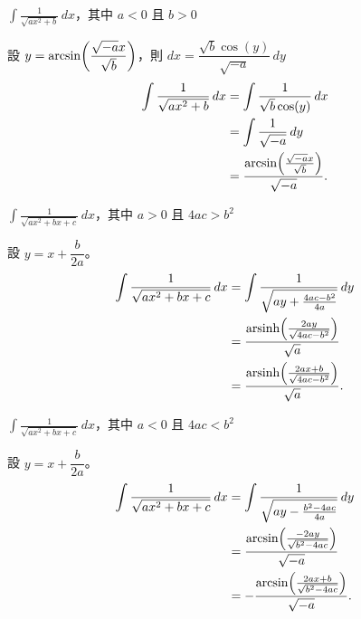 \documentclass{beamer}
\newcommand{\Left} {\mathopen{}\mathclose\bgroup\left}
\newcommand{\Right}{\aftergroup\egroup\right}
\newcommand{\arsinh}{\operatorname{arsinh}}
\theoremstyle{remark}
\begin{document}
\begin{CJK}{UTF8}{bsmi}
\begin{frame}{$\displaystyle \int \frac{1}{\sqrt{ax^2 + b}}\,dx$，其中 $a < 0$ 且 $b > 0$}
  \begin{solution}
    設 $y = \arcsin \Left( \dfrac{\sqrt{-a}x}{\sqrt b} \Right)$，則 $dx = \dfrac{\sqrt b \cos(y)}{\sqrt{-a}}\,dy$
    \begin{align*}
      \int \frac{1}{\sqrt{ax^2 + b}}\,dx &= \int \frac{1}{\sqrt b \cos(y)}\,dx\\
	&= \int \frac{1}{\sqrt{-a}}\,dy\\
	&= \frac{\arcsin \Left( \frac{\sqrt{-a}x}{\sqrt b} \Right)}{\sqrt{-a}}.
    \end{align*}
  \end{solution}
\end{frame}

\begin{frame}{$\displaystyle \int \frac{1}{\sqrt{ax^2 + bx + c}}\,dx$，其中 $a > 0$ 且 $4ac > b^2$}
  \begin{solution}
    設 $y = x + \dfrac{b}{2a}$。
    \begin{align*}
      \int \frac{1}{\sqrt{ax^2 + bx + c}}\,dx &= \int \frac{1}{\sqrt{ay + \frac{4ac - b^2}{4a}}}\,dy\\
	&= \frac{\arsinh \Left( \frac{2ay}{\sqrt{4ac - b^2}} \Right)}{\sqrt a}\\
	&= \frac{\arsinh \Left( \frac{2ax + b}{\sqrt{4ac - b^2}} \Right)}{\sqrt a}.
    \end{align*}
  \end{solution}
\end{frame}

\begin{frame}{$\displaystyle \int \frac{1}{\sqrt{ax^2 + bx + c}}\,dx$，其中 $a < 0$ 且 $4ac < b^2$}
  \begin{solution}
    設 $y = x + \dfrac{b}{2a}$。
    \begin{align*}
      \int \frac{1}{\sqrt{ax^2 + bx + c}}\,dx &= \int \frac{1}{\sqrt{ay - \frac{b^2 - 4ac}{4a}}}\,dy\\
	&= \frac{\arcsin \Left( \frac{-2ay}{\sqrt{b^2 - 4ac}} \Right)}{\sqrt{-a}}\\
	&= -\frac{\arcsin \Left( \frac{2ax + b}{\sqrt{b^2 - 4ac}} \Right)}{\sqrt{-a}}.
    \end{align*}
  \end{solution}
\end{frame}


\end{CJK}
\end{document}
